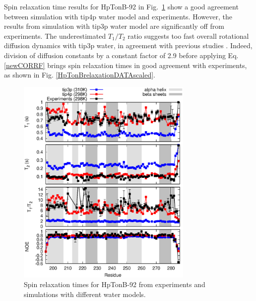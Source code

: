 \documentclass[pre,aps,floatfix,authordate1-4,twocolumn]{revtex4-1}
\begin{document}
Spin relaxation time results for HpTonB-92 in Fig.~\ref{HpTonBrelaxationDATA} show 
a good agreement between simulation with tip4p water model and experiments.
However, the results from simulation with tip3p water model are significantly
off from experiments. The underestimated  $T_1/T_2$ ratio suggests too
fast overall rotational diffusion dynamics \cite{carper97} with tip3p water,
in agreement with previous studies \cite{wong08}. Indeed, division
of diffusion constants by a constant factor of 2.9 before applying
Eq. \ref{newCORRF} brings spin relaxation times in good agreement with experiments,
as shown in Fig. \ref{HpTonBrelaxationDATAscaled}.
\begin{figure}[!h]
  \includegraphics[width=8.5cm]{../Figs/HpTonBrelaxationDATA.eps}%
  \caption{Spin relaxation times for HpTonB-92 from experiments \cite{??}
    and simulations with different water models.
    \label{HpTonBrelaxationDATA}}%
\end{figure}
\end{document}
